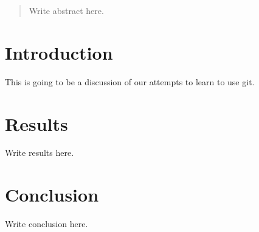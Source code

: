 \documentclass{article}
\begin{document}
\begin{abstract}
Write abstract here.
\end{abstract}

\section{Introduction}

This is going to be a discussion of our attempts to learn to use git.

\section{Results}

Write results here.

\section{Conclusion}

Write conclusion here.
\end{document}
